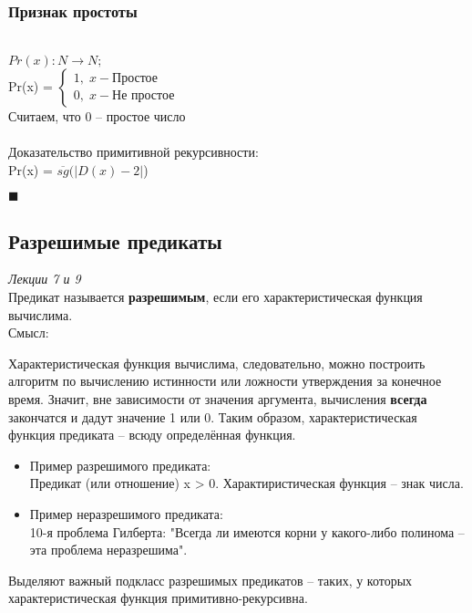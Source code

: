 \subsubsection{Признак простоты}\\
    $Pr(x): N \rightarrow N;$\\
    Pr(x) = 
    $\left\{ 
        \begin{aligned} 
        1,\; x - \text{Простое}\;\;\;\;\;\\
        0,\; x - \text{Не простое}
    \end{aligned}
    \right. $
    \\Считаем, что 0 -- простое число\\
    \\Доказательство примитивной рекурсивности:\\
    Pr(x) = $\overline{sg}(|D(x) - 2|$)
    \begin{flushright}
        $\blacksquare$
    \end{flushright}
        
        
     

\subsection{Разрешимые предикаты}
\emph{Лекции 7 и 9}\\

    Предикат называется \textbf{разрешимым}, если его характеристическая функция вычислима. \\
    
    Смысл:
        
        Характеристическая функция вычислима, следовательно, можно построить алгоритм по вычислению истинности или ложности утверждения за конечное время. Значит, вне зависимости от значения аргумента, вычисления \textbf{всегда} закончатся и дадут значение 1 или 0. Таким образом, характеристическая функция предиката -- всюду определённая функция.
    \begin{itemize}
        \item Пример разрешимого предиката:\\
                Предикат (или отношение) x > 0. Характиристическая функция -- знак числа.
        \item Пример неразрешимого предиката:\\
                10-я проблема Гилберта: "Всегда ли имеются корни у какого-либо полинома -- эта проблема неразрешима".
    \end{itemize}
    Выделяют важный подкласс разрешимых предикатов -- таких, у которых характеристическая функция примитивно-рекурсивна.

